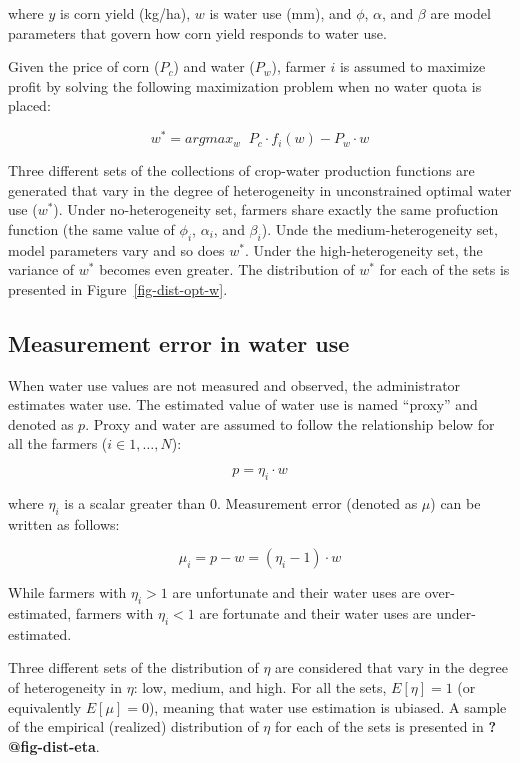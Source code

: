 \documentclass[
  letterpaper,
  DIV=11,
  numbers=noendperiod]{scrartcl}
\begin{document}
where \(y\) is corn yield (kg/ha), \(w\) is water use (mm), and
\(\phi\), \(\alpha\), and \(\beta\) are model parameters that govern how
corn yield responds to water use.

Given the price of corn (\(P_c\)) and water (\(P_w\)), farmer \(i\) is
assumed to maximize profit by solving the following maximization problem
when no water quota is placed:

\begin{equation}
w^* = argmax_{w} \;\; P_c \cdot f_i(w) - P_w \cdot w
\end{equation}

Three different sets of the collections of crop-water production
functions are generated that vary in the degree of heterogeneity in
unconstrained optimal water use (\(w^*\)). Under no-heterogeneity set,
farmers share exactly the same profuction function (the same value of
\(\phi_i\), \(\alpha_i\), and \(\beta_i\)). Unde the
medium-heterogeneity set, model parameters vary and so does \(w^*\).
Under the high-heterogeneity set, the variance of \(w^*\) becomes even
greater. The distribution of \(w^*\) for each of the sets is presented
in Figure~\ref{fig-dist-opt-w}.

\subsection{Measurement error in water
use}\label{measurement-error-in-water-use}

When water use values are not measured and observed, the administrator
estimates water use. The estimated value of water use is named ``proxy''
and denoted as \(p\). Proxy and water are assumed to follow the
relationship below for all the farmers (\(i \in 1,\dots, N\)):

\begin{equation}
p = \eta_i\cdot w
\end{equation}

where \(\eta_i\) is a scalar greater than 0. Measurement error (denoted
as \(\mu\)) can be written as follows:

\begin{equation}
\mu_i = p - w = (\eta_i - 1)\cdot w
\end{equation}

While farmers with \(\eta_i > 1\) are unfortunate and their water uses
are over-estimated, farmers with \(\eta_i < 1\) are fortunate and their
water uses are under-estimated.

Three different sets of the distribution of \(\eta\) are considered that
vary in the degree of heterogeneity in \(\eta\): low, medium, and high.
For all the sets, \(E[\eta] = 1\) (or equivalently \(E[\mu] = 0\)),
meaning that water use estimation is ubiased. A sample of the empirical
(realized) distribution of \(\eta\) for each of the sets is presented in
\textbf{?@fig-dist-eta}.
\end{document}
